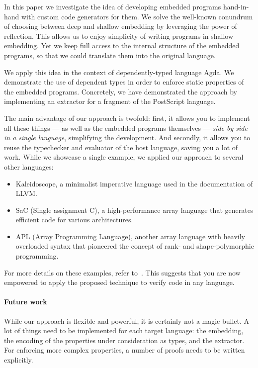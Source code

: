 \documentclass[sigplan,anonymous,review]{acmart}
\begin{document}
In this paper we investigate the idea of developing
embedded programs hand-in-hand with custom
code generators for them. We solve the well-known
conundrum of choosing between deep and shallow
embedding by leveraging the power of
reflection.
This allows us to enjoy simplicity of writing programs
in shallow embedding.  Yet we keep full access to the internal
structure of the embedded programs, so that we could translate
them into the original language.

We apply this idea in the context of dependently-typed
language Agda.  We demonstrate the use of dependent types
in order to enforce static properties of the embedded programs.
Concretely, we have demonstrated the approach by implementing
an extractor for a fragment of the PostScript language.

The main advantage of our approach is twofold: first, it allows
you to implement all these things --- as well as the embedded programs
themselves --- \emph{side by side in a single language}, simplifying
the development. And secondly, it allows you to reuse the typechecker
and evaluator of the host language, saving you a lot of work.
While we showcase a single example, we applied our approach to several other
languages:
\begin{itemize}
\item Kaleidoscope, a minimalist imperative language used in the
  documentation of LLVM.
\item SaC (Single assignment C), a high-performance array language
  that generates efficient code for various architectures.
\item APL (Array Programming Language), another array language with
  heavily overloaded syntax that pioneered the concept of rank- and
  shape-polymorphic programming.
\end{itemize}
For more details on these examples,
refer to~\citet{DBLP:journals/corr/abs-2105-10819}.
This suggests that you are now empowered to apply the proposed
technique to verify code in any language.



\paragraph{Future work}
While our approach is flexible and powerful, it is
certainly not a magic bullet. A lot of things
need to be implemented for each target language: the embedding,
the encoding of the properties under consideration as types,
and the extractor.  For enforcing more complex properties, a number
of proofs needs to be written explicitly.
\end{document}
